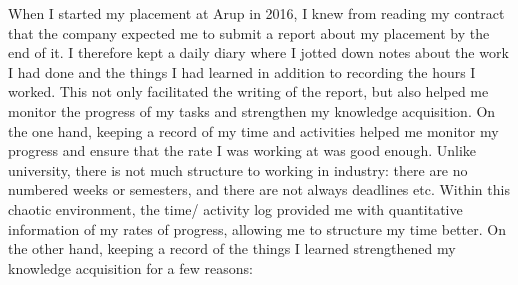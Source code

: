 When I started my placement at Arup in 2016, I knew from reading my contract that the company expected me to submit a report about my placement by the end of it.
I therefore kept a daily diary where I jotted down notes about the work I had done and the things I had learned in addition to recording the hours I worked.
This not only facilitated the writing of the report, but also helped me monitor the progress of my tasks and strengthen my knowledge acquisition.
On the one hand, keeping a record of my time and activities helped me monitor my progress and ensure that the rate I was working at was good enough.
Unlike university, there is not much structure to working in industry: there are no numbered weeks or semesters, and there are not always deadlines etc.
Within this chaotic environment, the time/ activity log provided me with quantitative information of my rates of progress, allowing me to structure my time better.
On the other hand, keeping a record of the things I learned strengthened my knowledge acquisition for a few reasons:
